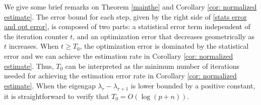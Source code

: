 \documentclass[11pt]{article}
\newcommand{\blue}{\color{black}}
\newcommand{\0}{{\mathbf{0}}}
\begin{document}

\par  We give some brief remarks on Theorem \ref{mainthe} and Corollary \ref{cor: normalized estimate}.
The error bound for each step, 
given by the right side of \eqref{stats error and opt error},
is composed of two parts: 
a statistical error term independent of the iteration counter $t$,
and an optimization error that decreases geometrically as $t$ increases. When $t\geq T_0$, the optimization error is dominated by the statistical error and we can achieve the estimation rate in Corollary \ref{cor: normalized estimate}. 
Thus, $T_0$ can be interpreted as the minimum number of iterations needed for achieving the estimation error rate in Corollary \ref{cor: normalized estimate}. 
When the eigengap $\lambda_r-\lambda_{r+1}$ is lower bounded by a positive constant, it is straightforward to verify that $T_0 = O(\log(p+n))$.
\end{document}
